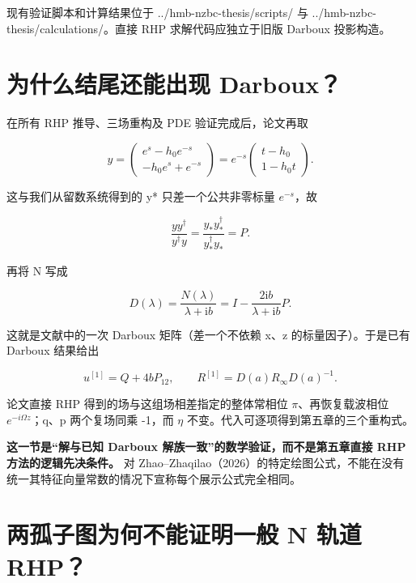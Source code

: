 {\sloppy \raggedright 现有验证脚本和计算结果位于 ../hmb-nzbc-thesis/scripts/ 与 ../hmb-nzbc-thesis/calculations/。直接 RHP 求解代码应独立于旧版 Darboux 投影构造。\par}

\section{为什么结尾还能出现 Darboux？}
\par

在所有 RHP 推导、三场重构及 PDE 验证完成后，论文再取\par

\[
y=
\begin{pmatrix}e^s-h_0e^{-s}\\-h_0e^s+e^{-s}\end{pmatrix}
=e^{-s}\begin{pmatrix}t-h_0\\1-h_0t\end{pmatrix}.
\]

这与我们从留数系统得到的 y* 只差一个公共非零标量 $e^{-s}$，故\par

\[
\dfrac{yy^\dagger}{y^\dagger y}
=\dfrac{y_*y_*^\dagger}{y_*^\dagger y_*}=P.
\]

再将 N 写成\par

\[
D(\lambda)=\dfrac{N(\lambda)}{\lambda+\mathrm{i}b}
=I-\dfrac{2\mathrm{i}b}{\lambda+\mathrm{i}b}P.
\]

这就是文献中的一次 Darboux 矩阵（差一个不依赖 x、z 的标量因子）。于是已有 Darboux 结果给出\par

\[
u^{[1]}=Q+4bP_{12},\qquad
R^{[1]}=D(a)R_\infty D(a)^{-1}.
\]

论文直接 RHP 得到的场与这组场相差指定的整体常相位 $\pi{}$、再恢复载波相位 $e^{-i\Omega{}z}$；q、p 两个复场同乘 -1，而 $\eta{}$ 不变。代入可逐项得到第五章的三个重构式。\par

\textbf{这一节是“解与已知 Darboux 解族一致”的数学验证，而不是第五章直接 RHP 方法的逻辑先决条件。} 对 Zhao–Zhaqilao（2026）的特定绘图公式，不能在没有统一其特征向量常数的情况下宣称每个展示公式完全相同。\par

\section{两孤子图为何不能证明一般 N 轨道 RHP？}

